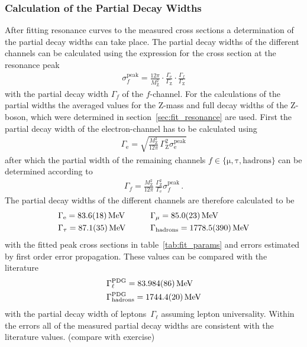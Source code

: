 \documentclass[11pt, a4paper]{article}
\numberwithin{equation}{section}
\newcommand{\korr}[1]{{\color{red}(#1)}}
\begin{document}
\subsubsection{Calculation of the Partial Decay Widths}
\label{sec:partial_widths}
After fitting resonance curves to the measured cross sections a determination of the partial decay widths can take place.
The partial decay widths of the different channels can be calculated using the expression for the cross section at the resonance peak \cite{instructions}
\begin{align*}
	\sigma_f^\mathrm{peak} = \frac{12 \pi}{M_\mathrm{Z}^2} \cdot \frac{\Gamma_\mathrm{e}}{\Gamma_\mathrm{Z}} \cdot \frac{\Gamma_f}{\Gamma_\mathrm{Z}}
\end{align*}
with the partial decay width $\Gamma_f$ of the $f$-channel.
For the calculations of the partial widths the averaged values for the Z-mass and full decay widths of the Z-boson, which were determined in section~\ref{sec:fit_resonance} are used.
First the partial decay width of the electron-channel has to be calculated using
\begin{align*}
	\Gamma_\mathrm{e} = \sqrt{\frac{M_\mathrm{Z}^2}{12 \pi} \, \Gamma_\mathrm{Z}^2 \sigma_\mathrm{e}^\mathrm{peak}}
\end{align*}
after which the partial width of the remaining channels $f \in \{ \mathrm{\mu}, \mathrm{\tau}, \mathrm{hadrons} \}$ can be determined according to
\begin{align*}
	\Gamma_f = \frac{M_\mathrm{Z}^2}{12 \pi } \, \frac{\Gamma_\mathrm{Z}^2 }{\Gamma_\mathrm{e}} \sigma_f^\mathrm{peak} \,\text{.}
\end{align*}
The partial decay widths of the different channels are therefore calculated to be
\begin{alignat*}{2}
	&\Gamma_\mathrm{e} = \SI{83.6 +- 1.8}{MeV} \qquad
	&&\Gamma_\mathrm{\mu} = \SI{85.0 +- 2.3}{MeV}\\
	&\Gamma_\mathrm{\tau} = \SI{87.1 +- 3.5}{MeV}\qquad
	&&\Gamma_\mathrm{hadrons} = \SI{1778.5 +- 39}{MeV}
\end{alignat*}
with the fitted peak cross sections in table~\ref{tab:fit_params} and errors estimated by first order error propagation.
These values can be compared with the literature \cite{pdg}
\begin{align*}
	&\Gamma_\ell^\mathrm{PDG} = \SI{83.984 +- 0.086}{MeV} \\
	&\Gamma_\mathrm{hadrons}^\mathrm{PDG} = \SI{1744.4 +- 2.0}{MeV}
\end{align*}
with the partial decay width of leptons~$\Gamma_\ell$ assuming lepton universality.
Within the errors all of the measured partial decay widths are consistent with the literature values.
\korr{compare with exercise}
\end{document}
